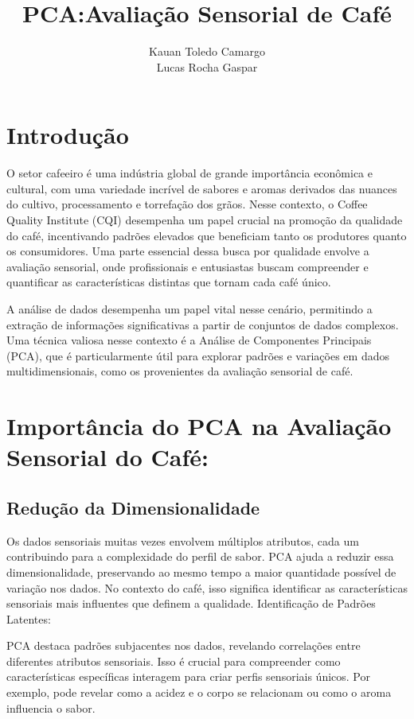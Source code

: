 \documentclass{article}
\title{PCA:Avaliação Sensorial de Café}
\author{
    Kauan Toledo Camargo\\
    Lucas Rocha Gaspar\\
}
\date{}
\begin{document}
\maketitle

\section{Introdução}

O setor cafeeiro é uma indústria global de grande importância econômica e cultural, com uma variedade incrível de sabores e aromas derivados das nuances do cultivo, processamento e torrefação dos grãos. Nesse contexto, o Coffee Quality Institute (CQI) desempenha um papel crucial na promoção da qualidade do café, incentivando padrões elevados que beneficiam tanto os produtores quanto os consumidores. Uma parte essencial dessa busca por qualidade envolve a avaliação sensorial, onde profissionais e entusiastas buscam compreender e quantificar as características distintas que tornam cada café único.

A análise de dados desempenha um papel vital nesse cenário, permitindo a extração de informações significativas a partir de conjuntos de dados complexos. Uma técnica valiosa nesse contexto é a Análise de Componentes Principais (PCA), que é particularmente útil para explorar padrões e variações em dados multidimensionais, como os provenientes da avaliação sensorial de café.

\section{Importância do PCA na Avaliação Sensorial do Café:}

\subsection{Redução da Dimensionalidade}

Os dados sensoriais muitas vezes envolvem múltiplos atributos, cada um contribuindo para a complexidade do perfil de sabor. PCA ajuda a reduzir essa dimensionalidade, preservando ao mesmo tempo a maior quantidade possível de variação nos dados. No contexto do café, isso significa identificar as características sensoriais mais influentes que definem a qualidade.
Identificação de Padrões Latentes:

PCA destaca padrões subjacentes nos dados, revelando correlações entre diferentes atributos sensoriais. Isso é crucial para compreender como características específicas interagem para criar perfis sensoriais únicos. Por exemplo, pode revelar como a acidez e o corpo se relacionam ou como o aroma influencia o sabor.
\end{document}
